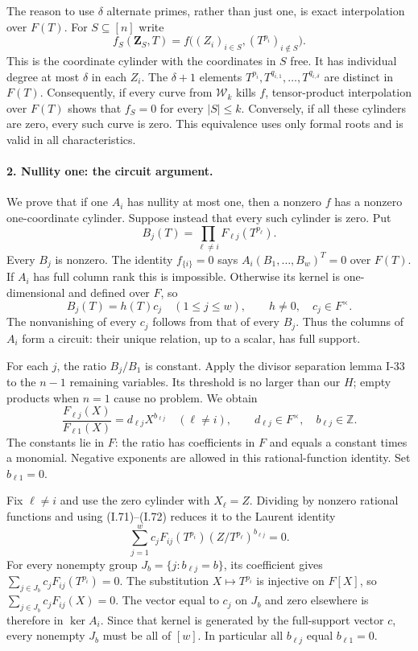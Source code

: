 \documentclass[11pt,a4paper]{article}
\theoremstyle{definition}\newtheorem{definition}{Definition}
\begin{document}
The reason to use $\delta$ alternate primes, rather than just
one, is exact interpolation over $F(T)$. For $S\subseteq[n]$
write
\[
 f_S(\mathbf Z_S,T)=
 f\bigl((Z_i)_{i\in S},(T^{p_i})_{i\notin S}\bigr).
 \tag{I.70}
\]
This is the coordinate cylinder with the coordinates in $S$
free. It has individual degree at most $\delta$ in each $Z_i$.
The $\delta+1$ elements
$T^{p_i},T^{q_{i,1}},\ldots,T^{q_{i,\delta}}$ are distinct
in $F(T)$. Consequently, if every curve from $\mathcal W_k$
kills $f$, tensor-product interpolation over $F(T)$ shows that
$f_S=0$ for every $|S|\le k$. Conversely, if all these cylinders
are zero, every such curve is zero. This equivalence uses only
formal roots and is valid in all characteristics.

\paragraph{2. Nullity one: the circuit argument.}
We prove that if one $A_i$ has nullity at most one, then a
nonzero $f$ has a nonzero one-coordinate cylinder. Suppose
instead that every such cylinder is zero. Put
\[
 B_j(T)=\prod_{\ell\ne i}F_{\ell j}(T^{p_\ell}).
\]
Every $B_j$ is nonzero. The identity $f_{\{i\}}=0$ says
$A_i(B_1,\ldots,B_w)^T=0$ over $F(T)$.
If $A_i$ has full column rank this is impossible. Otherwise
its kernel is one-dimensional and defined over $F$, so
\[
 B_j(T)=h(T)c_j\quad(1\le j\le w),
 \qquad h\ne0,\quad c_j\in F^\times.
 \tag{I.71}
\]
The nonvanishing of every $c_j$ follows from that of every
$B_j$. Thus the columns of $A_i$ form a circuit: their unique
relation, up to a scalar, has full support.

For each $j$, the ratio $B_j/B_1$ is constant. Apply the
divisor separation lemma I-33 to the $n-1$ remaining variables.
Its threshold is no larger than our $H$; empty products when
$n=1$ cause no problem. We obtain
\[
 \frac{F_{\ell j}(X)}{F_{\ell1}(X)}
       =d_{\ell j}X^{b_{\ell j}}
 \quad(\ell\ne i),
 \qquad d_{\ell j}\in F^\times,
 \quad b_{\ell j}\in\mathbb Z.
 \tag{I.72}
\]
The constants lie in $F$: the ratio has coefficients in $F$
and equals a constant times a monomial. Negative exponents
are allowed in this rational-function identity. Set
$b_{\ell1}=0$.

Fix $\ell\ne i$ and use the zero cylinder with $X_\ell=Z$.
Dividing by nonzero rational functions and using (I.71)--(I.72)
reduces it to the Laurent identity
\[
 \sum_{j=1}^w c_j F_{ij}(T^{p_i})
       (Z/T^{p_\ell})^{b_{\ell j}}=0.
 \tag{I.73}
\]
For every nonempty group $J_b=\{j:b_{\ell j}=b\}$, its
coefficient gives
$\sum_{j\in J_b}c_jF_{ij}(T^{p_i})=0$.
The substitution $X\mapsto T^{p_i}$ is injective on $F[X]$,
so $\sum_{j\in J_b}c_jF_{ij}(X)=0$.
The vector equal to $c_j$ on $J_b$ and zero elsewhere is
therefore in $\ker A_i$. Since that kernel is generated by
the full-support vector $c$, every nonempty $J_b$ must be
all of $[w]$. In particular all $b_{\ell j}$ equal
$b_{\ell1}=0$.
\end{document}

